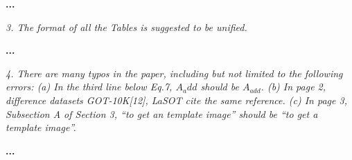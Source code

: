 \documentclass[12pt]{article}
\begin{document}
\textbf{...}

\textit{3. The format of all the Tables is suggested to be unified.}

\textbf{...}

\textit{
4. There are many typos in the paper, including but not limited to the following errors:
(a) In the third line below Eq.7, $A_{a}dd$ should be $A_{add}$.
(b) In page 2, difference datasets GOT-10K[12], LaSOT \cite{LaSOT} cite the same reference.
(c) In page 3, Subsection A of Section 3, “to get an template image” should be “to get a template image”.
}

\textbf{...}

\normalem


\end{document}

